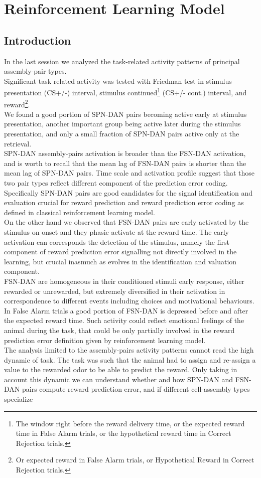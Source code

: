 \chapter{Reinforcement Learning Model}
\label{chap:RLModel}
\section{Introduction}
\label{sec:IntroRL}
In the last session we analyzed the task-related activity patterns of principal assembly-pair types.\\Significant task related activity was tested with Friedman test in stimulus presentation (CS+/-) interval, stimulus continued\footnote{The window right before the reward delivery time, or the expected reward time in False Alarm trials, or the hypothetical reward time in Correct Rejection trials.} (CS+/- cont.) interval, and reward\footnote{Or expected reward in False Alarm trials, or Hypothetical Reward in Correct Rejection trials.}.\\We found a good portion of SPN-DAN pairs becoming active early at stimulus presentation, another important group being active later during the stimulus presentation, and only a small fraction of SPN-DAN pairs active only at the retrieval.\\SPN-DAN assembly-pairs activation is broader than the FSN-DAN activation, and is worth to recall that the mean lag of FSN-DAN pairs is shorter than the mean lag of SPN-DAN pairs. Time scale and activation profile suggest that those two pair types reflect different component of the prediction error coding. Specifically SPN-DAN pairs are good candidates for the signal identification and evaluation crucial for reward prediction and reward prediction error coding as defined in classical reinforcement learning model.\\On the other hand we observed that FSN-DAN pairs are early activated by the stimulus on onset and they phasic activate at the reward time. The early activation can corresponds the detection of the stimulus, namely the first component of reward prediction error signalling not directly involved in the learning, but crucial inasmuch as evolves in the identification and valuation component.\\FSN-DAN are homogeneous in their conditioned stimuli early response, either rewarded or unrewarded, but extremely diversified in their activation in correspondence to different events including choices and motivational behaviours. In False Alarm trials a good portion of FSN-DAN is depressed before and after the expected reward time. Such activity could reflect emotional feelings of the animal during the task, that could be only partially involved in the reward prediction error definition given by reinforcement learning model.\\The analysis limited to the assembly-pairs activity patterns cannot read the high dynamic of task. The task was such that the animal had to assign and re-assign a value to the rewarded odor to be able to predict the reward. Only taking in account this dynamic we can understand whether and how SPN-DAN and FSN-DAN pairs compute reward prediction error, and if different cell-assembly types specialize 